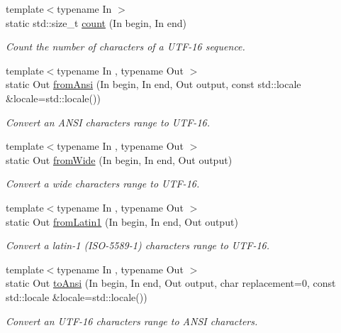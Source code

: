 \begin{DoxyCompactItemize}
{\footnotesize template$<$typename In $>$ }\\static std\-::size\-\_\-t \hyperlink{classburn_1_1_utf_3_0116_01_4_aa1ab713384aab517afab6bd5f99fdb46}{count} (In begin, In end)
\begin{DoxyCompactList}\small\item\em Count the number of characters of a U\-T\-F-\/16 sequence. \end{DoxyCompactList}\item 
{\footnotesize template$<$typename In , typename Out $>$ }\\static Out \hyperlink{classburn_1_1_utf_3_0116_01_4_af33edb529c7a3a5955e3b367dede544d}{from\-Ansi} (In begin, In end, Out output, const std\-::locale \&locale=std\-::locale())
\begin{DoxyCompactList}\small\item\em Convert an A\-N\-S\-I characters range to U\-T\-F-\/16. \end{DoxyCompactList}\item 
{\footnotesize template$<$typename In , typename Out $>$ }\\static Out \hyperlink{classburn_1_1_utf_3_0116_01_4_a0ce58bc9b87b5935814f24b44aefa1c6}{from\-Wide} (In begin, In end, Out output)
\begin{DoxyCompactList}\small\item\em Convert a wide characters range to U\-T\-F-\/16. \end{DoxyCompactList}\item 
{\footnotesize template$<$typename In , typename Out $>$ }\\static Out \hyperlink{classburn_1_1_utf_3_0116_01_4_af58adebc404c5885dda2072128874546}{from\-Latin1} (In begin, In end, Out output)
\begin{DoxyCompactList}\small\item\em Convert a latin-\/1 (I\-S\-O-\/5589-\/1) characters range to U\-T\-F-\/16. \end{DoxyCompactList}\item 
{\footnotesize template$<$typename In , typename Out $>$ }\\static Out \hyperlink{classburn_1_1_utf_3_0116_01_4_a1d4198bad6116e7e38d68537c88335f8}{to\-Ansi} (In begin, In end, Out output, char replacement=0, const std\-::locale \&locale=std\-::locale())
\begin{DoxyCompactList}\small\item\em Convert an U\-T\-F-\/16 characters range to A\-N\-S\-I characters. \end{DoxyCompactList}\item 

\end{DoxyCompactItemize}
